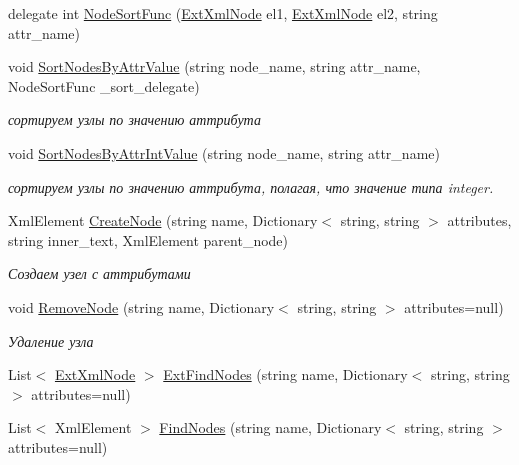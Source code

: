 \begin{DoxyCompactItemize}
delegate int \hyperlink{class_amusing_xml_1_1_xml_fun_a7c462fb50468785b5f85e9554acd0bf8}{NodeSortFunc} (\hyperlink{class_amusing_xml_1_1_ext_xml_node}{ExtXmlNode} el1, \hyperlink{class_amusing_xml_1_1_ext_xml_node}{ExtXmlNode} el2, string attr\_\-name)
\item 
void \hyperlink{class_amusing_xml_1_1_xml_fun_a6a3dd0a2dc82af41e5dad75db5207dff}{SortNodesByAttrValue} (string node\_\-name, string attr\_\-name, NodeSortFunc \_\-sort\_\-delegate)
\begin{DoxyCompactList}\small\item\em сортируем узлы по значению аттрибута \item\end{DoxyCompactList}\item 
void \hyperlink{class_amusing_xml_1_1_xml_fun_ab79e8636c62f5f8a87224d6b26c8935c}{SortNodesByAttrIntValue} (string node\_\-name, string attr\_\-name)
\begin{DoxyCompactList}\small\item\em сортируем узлы по значению аттрибута, полагая, что значение типа integer. \item\end{DoxyCompactList}\item 
XmlElement \hyperlink{class_amusing_xml_1_1_xml_fun_aa00f4baa0a689788c39395407823c6b2}{CreateNode} (string name, Dictionary$<$ string, string $>$ attributes, string inner\_\-text, XmlElement parent\_\-node)
\begin{DoxyCompactList}\small\item\em Создаем узел с аттрибутами \item\end{DoxyCompactList}\item 
void \hyperlink{class_amusing_xml_1_1_xml_fun_a9eae01f6380bf3b58933233a59bc9b2c}{RemoveNode} (string name, Dictionary$<$ string, string $>$ attributes=null)
\begin{DoxyCompactList}\small\item\em Удаление узла \item\end{DoxyCompactList}\item 
List$<$ \hyperlink{class_amusing_xml_1_1_ext_xml_node}{ExtXmlNode} $>$ \hyperlink{class_amusing_xml_1_1_xml_fun_ad3e94f40bb094227055f6ab051e61c61}{ExtFindNodes} (string name, Dictionary$<$ string, string $>$ attributes=null)
\item 
List$<$ XmlElement $>$ \hyperlink{class_amusing_xml_1_1_xml_fun_a48c4856b911446b2f862f51f1bb797a4}{FindNodes} (string name, Dictionary$<$ string, string $>$ attributes=null)

\end{DoxyCompactItemize}
